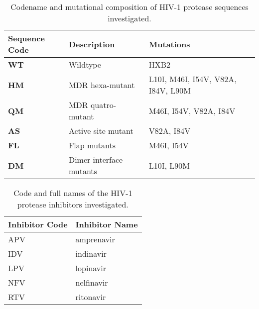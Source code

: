 \begin{compactenum}[a)]
\begin{table}[h! b! p!]
\begin{center}
\begin{tabular}{ l  l  l }
\textbf{Sequence Code} & \textbf{Description} & \textbf{Mutations}\\
\hline
\textbf{WT} & Wildtype & HXB2\\
\textbf{HM} & MDR hexa-mutant & L10I, M46I, I54V, V82A, I84V, L90M\\
\textbf{QM} & MDR quatro-mutant & M46I, I54V, V82A, I84V\\
\textbf{AS} & Active site mutant & V82A, I84V\\
\textbf{FL} & Flap mutants & M46I, I54V\\
\textbf{DM} & Dimer interface mutants & L10I, L90M\\ 
\hline
\end{tabular}
\end{center}
\caption{Codename and mutational composition of HIV-1 protease sequences investigated.}
\label{tab:mutations}
\end{table}

\begin{table}
\begin{center}
\begin{tabular}{l l}
\textbf{Inhibitor Code} & \textbf{Inhibitor Name}\\
\hline
APV & amprenavir\\
IDV & indinavir\\
LPV & lopinavir\\
NFV & nelfinavir\\
RTV & ritonavir\\
\hline
\end{tabular}
\end{center}
\caption{Code and full names of the HIV-1 protease inhibitors investigated.}
\label{tab:inhibitors}
\end{table}


\end{compactenum}
